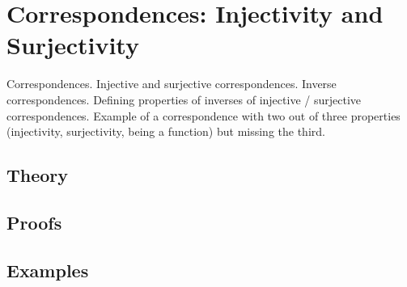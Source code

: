 
\section{Correspondences: Injectivity and Surjectivity}
\label{sec:2.2.02-correspondences}

\begin{ticket}
Correspondences. Injective and surjective correspondences. Inverse correspondences. Defining properties of inverses of injective / surjective correspondences. Example of a correspondence with two out of three properties (injectivity, surjectivity, being a function) but missing the third.
\end{ticket}

\subsection*{Theory}

\subsection*{Proofs}

\subsection*{Examples}
